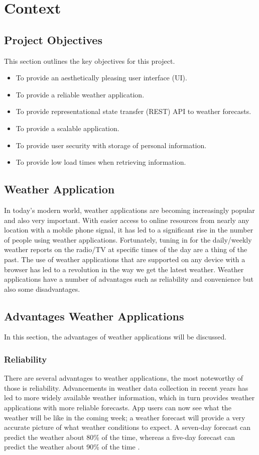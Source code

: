 \chapter{Context}
\section{Project Objectives}
This section outlines the key objectives for this project.
\begin{itemize}
    \item To provide an aesthetically pleasing user interface (UI).
    \item To provide a reliable weather application.
    \item To provide representational state transfer (REST) API to weather forecasts.
    \item To provide a scalable application.
    \item To provide user security with storage of personal information.
    \item To provide low load times when retrieving information.
\end{itemize}

\section{Weather Application}
In today's modern world, weather applications are becoming increasingly popular and also very important. With easier access to online resources from nearly any location with a mobile phone signal, it has led to a significant rise in the number of people using weather applications. Fortunately, tuning in for the daily/weekly weather reports on the radio/TV at specific times of the day are a thing of the past. The use of weather applications that are supported on any device with a browser has led to a revolution in the way we get the latest weather. Weather applications have a number of advantages such as reliability and convenience but also some disadvantages.

\section{Advantages Weather Applications}
In this section,  the advantages of weather applications will be discussed.

\subsection{Reliability}
There are several advantages to weather applications, the most noteworthy of those is reliability. Advancements in weather data collection in recent years has led to more widely available weather information, which in turn provides weather applications with more reliable forecasts. App users can now see what the weather will be like in the coming week; a weather forecast will provide a very accurate picture of what weather conditions to expect. A seven-day forecast can predict the weather about 80\% of the time, whereas a five-day forecast can predict the weather about 90\% of the time \cite{weatherReliability}. 

